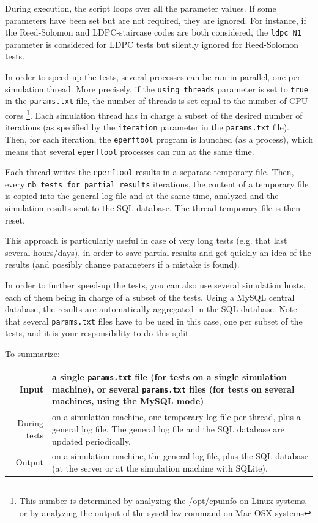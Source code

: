 \documentclass[a4paper,11pt]{article}
\begin{document}
{During execution, the script loops over all the parameter values.
If some parameters have been set but are not required, they are ignored.
For instance, if the Reed-Solomon and LDPC-staircase codes are both considered, the \verb+ldpc_N1+
parameter is considered for LDPC tests but silently ignored for Reed-Solomon tests.

In order to speed-up the tests, several processes can be run in parallel, one per simulation thread.
More precisely, if the \verb+using_threads+ parameter is set to \verb+true+ in the \verb+params.txt+
file, the number of threads is set equal to the number of CPU cores \footnote{This number is determined by
analyzing the /opt/cpuinfo on Linux systems, or by analyzing the output of the sysctl hw command
on Mac OSX systems}.
Each simulation thread has in charge a subset of the desired number of iterations (as specified
by the \verb+iteration+ parameter in the \verb+params.txt+ file).
Then, for each iteration, the \verb+eperftool+ program is launched (as a process), which means
that several \verb+eperftool+ processes can run at the same time.

Each thread writes the \verb+eperftool+ results in a separate temporary file.
Then, every \verb+nb_tests_for+\-\verb+_partial+\-\verb+_results+ iterations, the content of a temporary file
is copied into the general log file and at the same time, analyzed and the simulation results
sent to the SQL database.
The thread temporary file is then reset.

This approach is particularly useful in case of very long tests (e.g. that last
several hours/days), in order to save partial results and get quickly an
idea of the results (and possibly change parameters if a mistake is found).

In order to further speed-up the tests, you can also use several simulation hosts,
each of them being in charge of a subset of the tests.
Using a MySQL central database, the results are automatically aggregated in the SQL database.
Note that several \verb+params.txt+ files have to be used in this case, one per subset of the
tests, and it is your responsibility to do this split.


To summarize:
\begin{table}[th]
\begin{center}
\begin{tabular}{|r|p{15cm}|}
\hline
Input		& a single \verb+params.txt+ file (for tests on a single simulation machine), or
		  several \verb+params.txt+ files (for tests on several machines, using the MySQL mode) \\
\hline
During tests	& on a simulation machine, one temporary log file per thread, plus a general log file.
		  The general log file and the SQL database are updated periodically. \\
\hline
Output		& on a simulation machine, the general log file, plus the SQL database (at the server
		  or at the simulation machine with SQLite). \\
\hline
\end{tabular}
\end{center}
\end{table}

}
\end{document}
